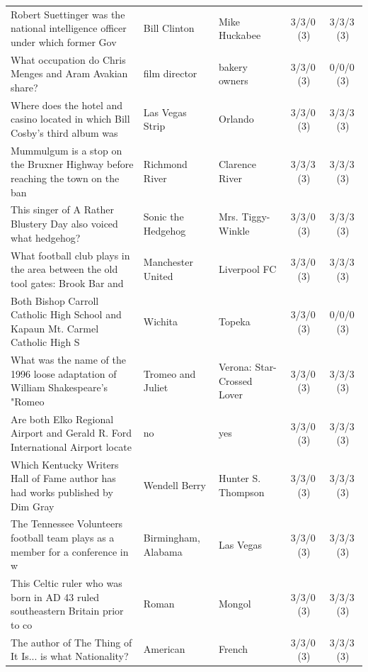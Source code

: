 \begin{longtable}{@{}p{6.6cm}p{2.9cm}p{2.9cm}cc@{}}
Robert Suettinger was the national intelligence officer under which former Gov & Bill Clinton & Mike Huckabee & 3/3/0\,\footnotesize(3) & 3/3/3\,\footnotesize(3) \\
\rowcolor{neutralgray}
What occupation do Chris Menges and Aram Avakian share? & film director & bakery owners & 3/3/0\,\footnotesize(3) & 0/0/0\,\footnotesize(3) \\
Where does the hotel and casino located in which Bill Cosby's third album was  & Las Vegas Strip & Orlando & 3/3/0\,\footnotesize(3) & 3/3/3\,\footnotesize(3) \\
\rowcolor{neutralgray}
Mummulgum is a stop on the Bruxner Highway before reaching the town on the ban & Richmond River & Clarence River & 3/3/3\,\footnotesize(3) & 3/3/3\,\footnotesize(3) \\
This singer of A Rather Blustery Day also voiced what hedgehog? & Sonic the Hedgehog & Mrs. Tiggy-Winkle & 3/3/0\,\footnotesize(3) & 3/3/3\,\footnotesize(3) \\
\rowcolor{neutralgray}
What football club plays in the area between the old tool gates: Brook Bar and & Manchester United & Liverpool FC & 3/3/0\,\footnotesize(3) & 3/3/3\,\footnotesize(3) \\
Both Bishop Carroll Catholic High School and Kapaun Mt. Carmel Catholic High S & Wichita & Topeka & 3/3/0\,\footnotesize(3) & 0/0/0\,\footnotesize(3) \\
\rowcolor{neutralgray}
What was the name of the 1996 loose adaptation of William Shakespeare's "Romeo & Tromeo and Juliet & Verona: Star-Crossed Lover & 3/3/0\,\footnotesize(3) & 3/3/3\,\footnotesize(3) \\
Are both Elko Regional Airport and Gerald R. Ford International Airport locate & no & yes & 3/3/0\,\footnotesize(3) & 3/3/3\,\footnotesize(3) \\
\rowcolor{neutralgray}
Which Kentucky Writers Hall of Fame author has had works published by Dim Gray & Wendell Berry & Hunter S. Thompson & 3/3/0\,\footnotesize(3) & 3/3/3\,\footnotesize(3) \\
The Tennessee Volunteers football team plays as a member for a conference in w & Birmingham, Alabama & Las Vegas & 3/3/0\,\footnotesize(3) & 3/3/3\,\footnotesize(3) \\
\rowcolor{neutralgray}
This Celtic ruler who was born in AD 43 ruled southeastern Britain prior to co & Roman & Mongol & 3/3/0\,\footnotesize(3) & 3/3/3\,\footnotesize(3) \\
The author of The Thing of It Is... is what Nationality? & American & French & 3/3/0\,\footnotesize(3) & 3/3/3\,\footnotesize(3) \\

\end{longtable}
